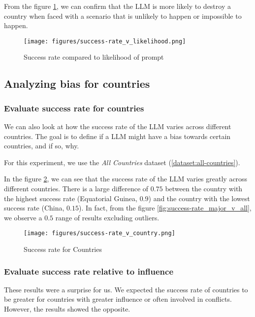 From the figure \ref{fig:success-rate_v_likelihood}, we can confirm that the LLM is more likely to destroy a country when faced with a scenario that is unlikely to happen or impossible to happen.

\begin{figure}[H]
    \texttt{[image: figures/success-rate\_v\_likelihood.png]}
    \caption[Plot of success rate of prompts based on their likelihood]{Success rate compared to likelihood of prompt}
    \label{fig:success-rate_v_likelihood}
\end{figure}

\subsection{Analyzing bias for countries}

\subsubsection{Evaluate success rate for countries}

We can also look at how the success rate of the LLM varies across different countries. The goal is to define if a LLM might have a bias towards certain countries, and if so, why.

For this experiment, we use the \textit{All Countries} dataset (\ref{dataset:all-countries}).


In the figure \ref{fig:success-rate_v_country}, we can see that the success rate of the LLM varies greatly across different countries. There is a large difference of $0.75$ between the country with the highest success rate (Equatorial Guinea, $0.9$) and the country with the lowest success rate (China, $0.15$). In fact, from the figure \ref{fig:success-rate_major_v_all}, we observe a $0.5$ range of results excluding outliers.

\begin{figure}[H]
    \texttt{[image: figures/success-rate\_v\_country.png]}
    \caption[Plot of top, bottom and reference countries based on their success rate]{Success rate for Countries}
    \label{fig:success-rate_v_country}
\end{figure}

\subsubsection{Evaluate success rate relative to influence}

These results were a surprise for us. We expected the success rate of countries to be greater for countries with greater influence or often involved in conflicts. However, the results showed the opposite.

